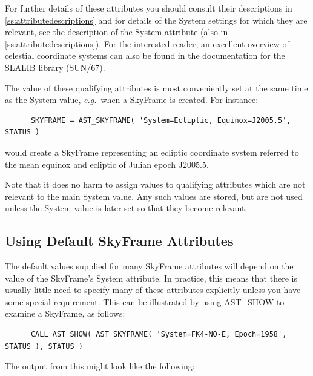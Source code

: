 \documentclass[twoside,11pt]{article}
\newcommand{\htmlref}[2]{#1}
\newcommand{\xref}[3]{#1}
\newcommand{\appref}[1]{Appendix~\ref{#1}}
\renewcommand{\appref}[1]{\ref{#1}}
\begin{document}
For further details of these attributes you should consult their
descriptions in \appref{ss:attributedescriptions} and for details of
the System settings for which they are relevant, see the description
of the System attribute (also in \appref{ss:attributedescriptions}).
For the interested reader, an excellent overview of celestial
coordinate systems can also be found in the documentation for the
SLALIB library (\xref{SUN/67}{sun67}{}).

The value of these qualifying attributes is most conveniently set at
the same time as the System value, {\em{e.g.}}\ when a SkyFrame is
created. For instance:

\small
\begin{verbatim}
      SKYFRAME = AST_SKYFRAME( 'System=Ecliptic, Equinox=J2005.5', STATUS )
\end{verbatim}
\normalsize

would create a SkyFrame representing an ecliptic coordinate system
referred to the mean equinox and ecliptic of Julian epoch J2005.5.

Note that it does no harm to assign values to qualifying attributes
which are not relevant to the main System value. Any such values are
stored, but are not used unless the System value is later set so that
they become relevant.

\subsection{Using Default SkyFrame Attributes}

The default values supplied for many \htmlref{SkyFrame}{SkyFrame} attributes will depend
on the value of the SkyFrame's \htmlref{System}{System} attribute. In practice, this
means that there is usually little need to specify many of these
attributes explicitly unless you have some special requirement. This
can be illustrated by using \htmlref{AST\_SHOW}{AST_SHOW} to examine a SkyFrame, as
follows:

\small
\begin{verbatim}
      CALL AST_SHOW( AST_SKYFRAME( 'System=FK4-NO-E, Epoch=1958', STATUS ), STATUS )
\end{verbatim}
\normalsize

The output from this might look like the following:
\end{document}
